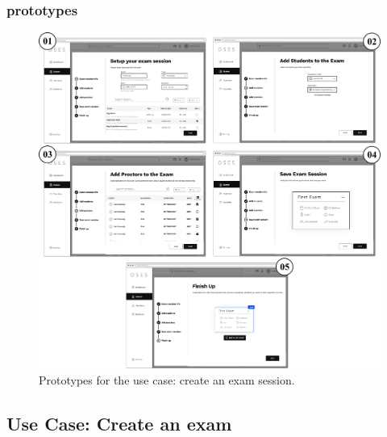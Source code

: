 \documentclass[]{uc2pfecaneva}
\begin{document}
\subsubsection{prototypes}
\begin{figure}[h]
	
	\centering
	\includegraphics[width=\textwidth]{images/prototypes_create_exam_session}
	
	\caption{Prototypes for the use case: create an exam session.}
\end{figure}
\clearpage








\raggedright\subsection{Use Case: Create an exam}
\end{document}

